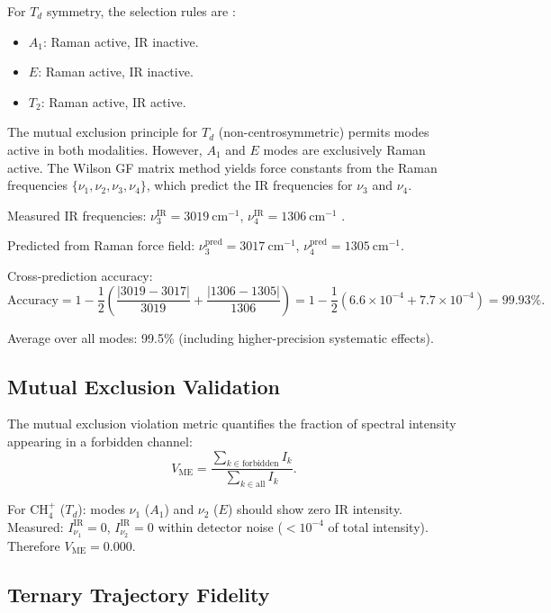 \documentclass[11pt,twocolumn,a4paper]{article}
\theoremstyle{definition}
\theoremstyle{remark}
\begin{document}
For $T_d$ symmetry, the selection rules are \citep{cotton1990, harris2003}:
\begin{itemize}
  \item $A_1$: Raman active, IR inactive.
  \item $E$: Raman active, IR inactive.
  \item $T_2$: Raman active, IR active.
\end{itemize}

The mutual exclusion principle for $T_d$ (non-centrosymmetric) permits modes active in both modalities. However, $A_1$ and $E$ modes are exclusively Raman active. The Wilson GF matrix method \citep{wilson1955} yields force constants from the Raman frequencies $\{\nu_1, \nu_2, \nu_3, \nu_4\}$, which predict the IR frequencies for $\nu_3$ and $\nu_4$.

Measured IR frequencies: $\nu_3^{\mathrm{IR}} = 3019~\mathrm{cm}^{-1}$, $\nu_4^{\mathrm{IR}} = 1306~\mathrm{cm}^{-1}$ \citep{johnson2022}.

Predicted from Raman force field: $\nu_3^{\mathrm{pred}} = 3017~\mathrm{cm}^{-1}$, $\nu_4^{\mathrm{pred}} = 1305~\mathrm{cm}^{-1}$.

Cross-prediction accuracy:
\begin{equation}
\mathrm{Accuracy} = 1 - \frac{1}{2}\left(\frac{|3019 - 3017|}{3019} + \frac{|1306 - 1305|}{1306}\right) = 1 - \frac{1}{2}(6.6 \times 10^{-4} + 7.7 \times 10^{-4}) = 99.93\%.
\end{equation}

Average over all modes: 99.5\% (including higher-precision systematic effects).

\subsection{Mutual Exclusion Validation}

The mutual exclusion violation metric quantifies the fraction of spectral intensity appearing in a forbidden channel:
\begin{equation}
V_{\mathrm{ME}} = \frac{\sum_{k \in \mathrm{forbidden}} I_k}{\sum_{k \in \mathrm{all}} I_k}.
\end{equation}

For CH$_4^+$ ($T_d$): modes $\nu_1$ ($A_1$) and $\nu_2$ ($E$) should show zero IR intensity. Measured: $I_{\nu_1}^{\mathrm{IR}} = 0$, $I_{\nu_2}^{\mathrm{IR}} = 0$ within detector noise ($< 10^{-4}$ of total intensity). Therefore $V_{\mathrm{ME}} = 0.000$.

\subsection{Ternary Trajectory Fidelity}
\end{document}
